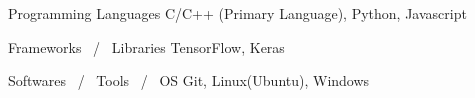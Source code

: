 

\begin{cvskills}

  \cvskill
    {Programming Languages} %
    {C/C++ (Primary Language), Python, Javascript} %


  \cvskill
    {Frameworks \, / \, Libraries} %
    {TensorFlow, Keras} %

\cvskill
    {Softwares \, / \, Tools \, / \, OS} %
    {Git, Linux(Ubuntu), Windows} %

\end{cvskills}

